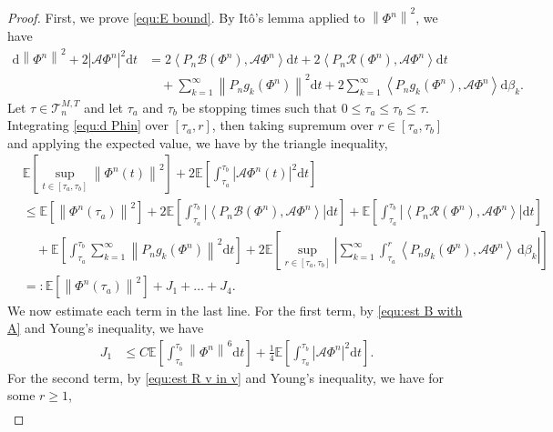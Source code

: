 \documentclass[11pt, reqno]{amsart}
\theoremstyle{definition}
\numberwithin{equation}{section}
\newcommand{\bb}{\mathbb}
\newcommand{\dt}{\mathrm{d}t}
\newcommand{\norm}[1]{\left\|{#1}\right\|}
\newcommand{\inpro}[2]{\left\langle#1,#2\right\rangle}
\newcommand{\abs}[1]{\left|{#1}\right|}
\begin{document}
\begin{proof}
First, we prove \eqref{equ:E bound}. By It\^o's lemma applied to $\norm{\Phi^n}^2$, we have
\begin{align}\label{equ:d Phin}
	\mathrm{d} \norm{\Phi^{n}}^2
	+
	2 \abs{\mathcal{A} \Phi^{n}}^2 \dt 
	&=
	2\inpro{P_n \mathcal{B}(\Phi^n)}{\mathcal{A}\Phi^{n}} \dt
	+ 
	2\inpro{ P_n \mathcal{R}(\Phi^n)}{\mathcal{A} \Phi^{n}} \dt
	\nonumber\\
	&\quad
	+
	\sum_{k=1}^\infty \norm{P_n g_k(\Phi^n)}^2 \dt
	+
	2\sum_{k=1}^\infty \inpro{P_n g_k(\Phi^n)}{\mathcal{A} \Phi^{n}} \mathrm{d}\beta_k.
\end{align}
Let $\tau\in \mathcal{T}_n^{M,T}$ and let $\tau_a$ and $\tau_b$ be stopping times such that $0\leq \tau_a\leq \tau_b\leq \tau$. Integrating \eqref{equ:d Phin} over $[\tau_a,r]$, then taking supremum over $r\in [\tau_a,\tau_b]$ and applying the expected value, we have by the triangle inequality,
\begin{align}\label{equ:I1a to I4a}
	&\bb{E} \left[ \sup_{t\in [\tau_a,\tau_b]} \norm{\Phi^{n}(t)}^2 \right] 
	+
	2\bb{E} \left[ \int_{\tau_a}^{\tau_b} \abs{\mathcal{A}\Phi^{n}(t)}^2 \dt \right]
	\nonumber\\
	&\leq
	\bb{E}\left[ \norm{\Phi^{n}(\tau_a)}^2 \right]
	+
	2\bb{E} \left[ \int_{\tau_a}^{\tau_b} \abs{\inpro{P_n \mathcal{B}(\Phi^n)}{\mathcal{A} \Phi^{n}}} \dt \right]
	+
	\bb{E} \left[ \int_{\tau_a}^{\tau_b} \abs{\inpro{P_n \mathcal{R}(\Phi^n)}{\mathcal{A} \Phi^{n}}} \dt \right]
	\nonumber\\
	&\quad
	+
	\bb{E} \left[ \int_{\tau_a}^{\tau_b} \sum_{k=1}^\infty \norm{P_n g_k(\Phi^n)}^2 \dt \right]
	+
	2 \bb{E} \left[ \sup_{r\in [\tau_a,\tau_b]} \left| \sum_{k=1}^\infty \int_{\tau_a}^r \inpro{P_n g_k(\Phi^n)}{\mathcal{A} \Phi^{n}}\, \mathrm{d}\beta_k \right| \right]
	\nonumber\\
	&=: \bb{E}\left[ \norm{\Phi^{n}(\tau_a)}^2 \right] +J_1+ \ldots+ J_4.
\end{align}
We now estimate each term in the last line. For the first term, by \eqref{equ:est B with A} and Young's inequality, we have 
\begin{align}\label{equ:J1}
	J_1
	&\leq
	C \bb{E}\left[ \int_{\tau_a}^{\tau_b} \norm{\Phi^{n}}^6 \dt \right] 
	+ \frac14 \bb{E}\left[\int_{\tau_a}^{\tau_b} \abs{\mathcal{A} \Phi^{n}}^2 \dt \right].
\end{align}
For the second term, by \eqref{equ:est R v in v} and Young's inequality, we have for some $r\geq 1$,
\begin{align}\label{equ:J2}

\end{align}
\end{proof}
\end{document}
